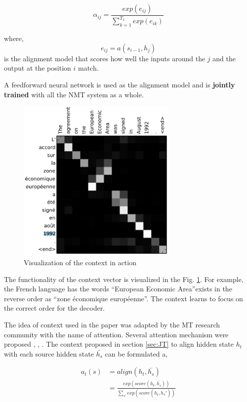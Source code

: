 \documentclass[a4paper]{article}
\begin{document}
\begin{equation*}
  \alpha_{ij} = \frac{ exp (e_{ij})}{ \sum_{k=1}^{T_x} exp(e_{ik})}
\end{equation*}


where, $$ e_{ij}  = a(s_{i-1},  h_j)  $$ is the alignment model that  scores how
well the inputs around the $j$ and the output at the position $i$ match.

A   feedforward  neural  network   is  used  as   the  alignment  model  and  is
\textbf{jointly trained} with all the NMT system as a whole.


\begin{figure}
  \center
  \includegraphics[height=8cm]{img/contextres.png}
  \caption{Visualization of the context in action}
  \label{fig:contextvis}
\end{figure}


The  functionality   of  the   context   vector  is  visualized  in   the   Fig.
\ref{fig:contextvis}.   For  example,  the  French  language   has   the   words
\textquotedblleft European Economic Area\textquotedblright exists in the reverse
order as \textquotedblleft zone \'{e}conomique europ\'{e}enne\textquotedblright.
The context learns to focus on the correct order for the decoder.

The idea of  context used in the paper was adapted by the MT  research community
with   the  name  of  attention.  Several  attention  mechanism   were  proposed
\cite{luong2015effective},  \cite{cho2014learning},  \cite{gregor2015draw}.  The
context proposed in section \ref{sec:JT} to  align hidden state  $h_t$ with each
source hidden state $\bar{h_s}$ can be formulated a,


\begin{equation}
  \begin{split}
    a_t(s) & = align(h_t,\bar{h_s}) \\
    & = \frac{exp(score(h_t,\bar{h_s}))}{\sum_{s'} exp(score(h_t,\bar{h_s'}))}
  \end{split}
\end{equation}
\end{document}
